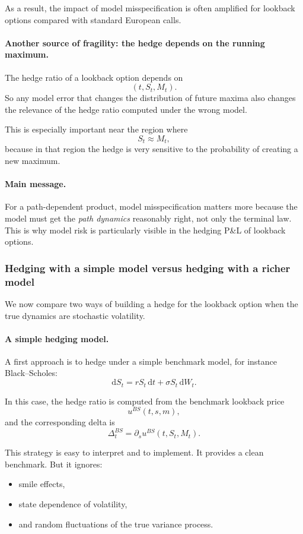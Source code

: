 \documentclass[11pt]{article}
\theoremstyle{plain}
\theoremstyle{definition}
\theoremstyle{remark}
\begin{document}
As a result, the impact of model misspecification is often amplified for
lookback options compared with standard European calls.

\paragraph{Another source of fragility: the hedge depends on the running maximum.}
The hedge ratio of a lookback option depends on
\[
(t,S_t,M_t).
\]
So any model error that changes the distribution of future maxima also
changes the relevance of the hedge ratio computed under the wrong model.

This is especially important near the region where
\[
S_t\approx M_t,
\]
because in that region the hedge is very sensitive to the probability of
creating a new maximum.

\paragraph{Main message.}
For a path-dependent product, model misspecification matters more
because the model must get the \emph{path dynamics} reasonably right,
not only the terminal law.
This is why model risk is particularly visible in the hedging P\&L of
lookback options.

\subsubsection{Hedging with a simple model versus hedging with a richer model}

We now compare two ways of building a hedge for the lookback option when
the true dynamics are stochastic volatility.

\paragraph{A simple hedging model.}
A first approach is to hedge under a simple benchmark model, for
instance Black--Scholes:
\[
\mathrm{d}S_t=rS_t\,\mathrm{d}t+\sigma S_t\,\mathrm{d}W_t.
\]

In this case, the hedge ratio is computed from the benchmark lookback
price
\[
u^{BS}(t,s,m),
\]
and the corresponding delta is
\[
\Delta_t^{BS}
=
\partial_s u^{BS}(t,S_t,M_t).
\]

This strategy is easy to interpret and to implement.
It provides a clean benchmark.
But it ignores:
\begin{itemize}[leftmargin=1.4em]
    \item smile effects,
    \item state dependence of volatility,
    \item and random fluctuations of the true variance process.
\end{itemize}
\end{document}
